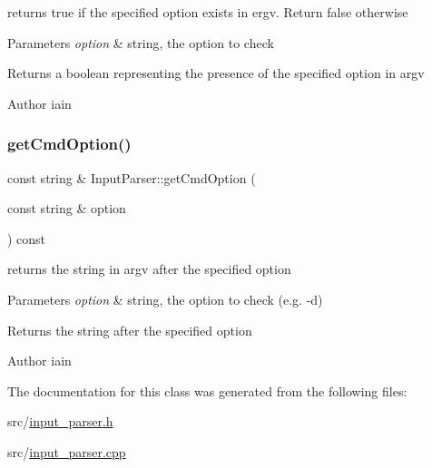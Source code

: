 returns true if the specified option exists in ergv. Return false otherwise 


\begin{DoxyParams}{Parameters}
{\em option} & string, the option to check \\
\hline
\end{DoxyParams}
\begin{DoxyReturn}{Returns}
a boolean representing the presence of the specified option in argv
\end{DoxyReturn}
\begin{DoxyAuthor}{Author}
iain 
\end{DoxyAuthor}
\mbox{\label{class_input_parser_a494c1de8c06fbb5a88343686e36fbf50}} 
\subsubsection{\texorpdfstring{get\+Cmd\+Option()}{getCmdOption()}}
{\footnotesize\ttfamily const string \& Input\+Parser\+::get\+Cmd\+Option (\begin{DoxyParamCaption}\item[{const string \&}]{option }\end{DoxyParamCaption}) const}



returns the string in argv after the specified option 


\begin{DoxyParams}{Parameters}
{\em option} & string, the option to check (e.\+g. -\/d) \\
\hline
\end{DoxyParams}
\begin{DoxyReturn}{Returns}
the string after the specified option
\end{DoxyReturn}
\begin{DoxyAuthor}{Author}
iain 
\end{DoxyAuthor}


The documentation for this class was generated from the following files\+:\begin{DoxyCompactItemize}
\item 
src/\mbox{\hyperlink{input__parser_8h}{input\+\_\+parser.\+h}}\item 
src/\mbox{\hyperlink{input__parser_8cpp}{input\+\_\+parser.\+cpp}}\end{DoxyCompactItemize}
